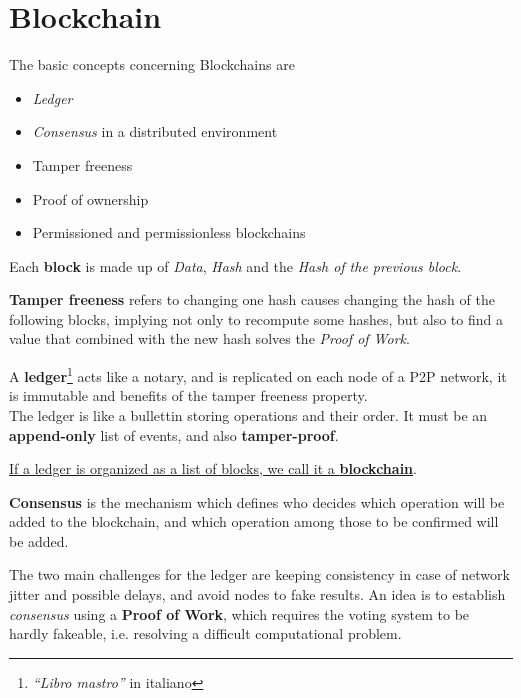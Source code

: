 \chapter{Blockchain}
The basic concepts concerning Blockchains are
\begin{itemize}
   \item \textit{Ledger}
   \item \textit{Consensus} in a distributed environment
   \item Tamper freeness
   \item Proof of ownership
   \item Permissioned and permissionless blockchains
\end{itemize}

Each \textbf{block} is made up of \textit{Data}, \textit{Hash} and the \textit{Hash of the previous block}.

\textbf{Tamper freeness} refers to changing one hash causes changing the hash of the following blocks, implying not only to recompute some hashes, but also to find a value that combined with the new hash solves the \textit{Proof of Work}.

A \textbf{ledger}\footnote{\textit{``Libro mastro''} in italiano} acts like a notary, and is replicated on each node of a P2P network, it is immutable and benefits of the tamper freeness property.\\
The ledger is like a bullettin storing operations and their order. It must be an \textbf{append-only} list of events, and also \textbf{tamper-proof}.

\begin{center}
   \ul{If a ledger is organized as a list of blocks, we call it a \textbf{blockchain}}.
\end{center}
\nl

\textbf{Consensus} is the mechanism which defines who decides which operation will be added to the blockchain, and which operation among those to be confirmed will be added.


The two main challenges for the ledger are keeping consistency in case of network jitter and possible delays, and avoid nodes to fake results.
An idea is to establish \textit{consensus} using a \textbf{Proof of Work}, which requires the voting system to be hardly fakeable, i.e. resolving a difficult computational problem.